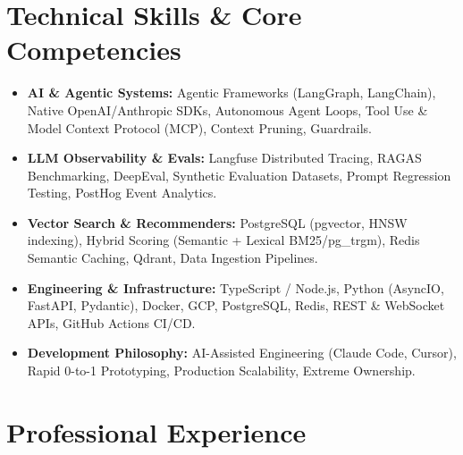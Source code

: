 \documentclass[a4paper,10pt]{article}
\begin{document}
\section{Technical Skills \& Core Competencies}
\begin{itemize}[leftmargin=1.2em, itemsep=2pt]
  \item \textbf{AI \& Agentic Systems:} Agentic Frameworks (LangGraph, LangChain), Native OpenAI/Anthropic SDKs, Autonomous Agent Loops, Tool Use \& Model Context Protocol (MCP), Context Pruning, Guardrails.
  \item \textbf{LLM Observability \& Evals:} Langfuse Distributed Tracing, RAGAS Benchmarking, DeepEval, Synthetic Evaluation Datasets, Prompt Regression Testing, PostHog Event Analytics.
  \item \textbf{Vector Search \& Recommenders:} PostgreSQL (pgvector, HNSW indexing), Hybrid Scoring (Semantic + Lexical BM25/pg\_trgm), Redis Semantic Caching, Qdrant, Data Ingestion Pipelines.
  \item \textbf{Engineering \& Infrastructure:} TypeScript / Node.js, Python (AsyncIO, FastAPI, Pydantic), Docker, GCP, PostgreSQL, Redis, REST \& WebSocket APIs, GitHub Actions CI/CD.
  \item \textbf{Development Philosophy:} AI-Assisted Engineering (Claude Code, Cursor), Rapid 0-to-1 Prototyping, Production Scalability, Extreme Ownership.
\end{itemize}

\section{Professional Experience}
\end{document}

